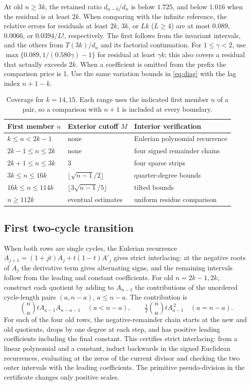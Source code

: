 \documentclass[11pt,reqno]{amsart}
\theoremstyle{remark}
\begin{document}
At old $n\ge3k$, the retained ratio $d_{n-b}/d_n$ is below $1.725$, and below $1.016$ when the residual is at least $2k$. When comparing with the infinite reference, the relative errors for residuals at least $2k$, $3k$, or $Lk$ ($L\ge4$) are at most $0.089$, $0.0066$, or $0.0394/L!$, respectively. The first follows from the invariant intervals, and the others from $T(3k)/d_n$ and its factorial continuation. For $1\le\gamma<2$, use
$\max\{0.089,1/(0.580\gamma)-1\}$ for residual at least $\gamma k$; this also covers a residual that actually exceeds $2k$. When a coefficient is omitted from the prefix the comparison price is 1. Use the same variation bounds in \eqref{eq:diag} with the lag index $n+1-k$.

\begin{table}[t]
\centering
\caption{Coverage for $k=14,15$. Each range uses the indicated first member $n$ of a pair, so a comparison with $n+1$ is included at every boundary.}
\label{tab:remaining}
\begin{tabular}{@{}lll@{}}
\toprule
First member $n$ & Exterior cutoff $M$ & Interior verification \\
\midrule
$k\le n<2k-1$ & none & Eulerian polynomial recurrence \\
$2k-1\le n\le2k$ & none & four signed remainder chains \\
$2k+1\le n\le3k$ & $3$ & four sparse strips \\
$3k\le n\le16k$ & $\lfloor\sqrt{n-1}/2\rfloor$ & quarter-degree bounds \\
$16k\le n\le114k$ & $\lfloor 3\sqrt{n-1}/5\rfloor$ & tilted bounds \\
$n\ge112k$ & eventual estimates & uniform residue comparison \\
\bottomrule
\end{tabular}
\end{table}

\subsection{First two-cycle transition}
When both rows are single cycles, the Eulerian recurrence
$A_{j+1}=(1+jt)A_j+t(1-t)A'_j$ gives strict interlacing: at the negative roots of $A_j$ the derivative term gives alternating signs, and the remaining intervals follow from the leading and constant coefficients. For old $n=2k-1,2k$, construct each quotient by adding to $A_{n-1}$ the contributions of the unordered cycle-length pairs $(a,n-a)$, $a\le n-a$. The contribution is
\[
 \binom{n}{a} t A_{a-1}A_{n-a-1}
 \quad(a<n-a),\qquad
 \tfrac12\binom{n}{a}tA_{a-1}^{\,2}\quad(a=n-a).
\]
For each of the four old rows, the negative-remainder chain starts at the new and old quotients, drops by one degree at each step, and has positive leading coefficients including the final constant. This certifies strict interlacing: from a linear polynomial and a constant, induct backwards in the signed Euclidean recurrences, evaluating at the zeros of the current divisor and checking the two outer intervals with the leading coefficients. The primitive pseudo-division in the certificate changes only positive scales.
\end{document}
